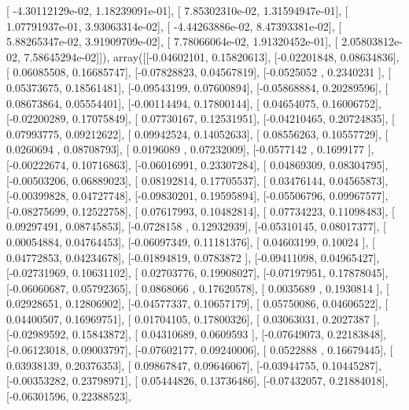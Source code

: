 \documentclass{article}
\begin{document}
       [ -4.30112129e-02,   1.18239091e-01],
       [  7.85302310e-02,   1.31594947e-01],
       [  1.07791937e-01,   3.93063314e-02],
       [ -4.44263886e-02,   8.47393381e-02],
       [  5.88265347e-02,   3.91909709e-02],
       [  7.78066064e-02,   1.91320452e-01],
       [  2.05803812e-02,   7.58645294e-02]]), array([[-0.04602101,  0.15820613],
       [-0.02201848,  0.08634836],
       [ 0.06085508,  0.16685747],
       [-0.07828823,  0.04567819],
       [-0.0525052 ,  0.2340231 ],
       [ 0.05373675,  0.18561481],
       [-0.09543199,  0.07600894],
       [-0.05868884,  0.20289596],
       [ 0.08673864,  0.05554401],
       [-0.00114494,  0.17800144],
       [ 0.04654075,  0.16006752],
       [-0.02200289,  0.17075849],
       [ 0.07730167,  0.12531951],
       [-0.04210465,  0.20724835],
       [ 0.07993775,  0.09212622],
       [ 0.09942524,  0.14052633],
       [ 0.08556263,  0.10557729],
       [ 0.0260694 ,  0.08708793],
       [ 0.0196089 ,  0.07232009],
       [-0.0577142 ,  0.1699177 ],
       [-0.00222674,  0.10716863],
       [-0.06016991,  0.23307284],
       [ 0.04869309,  0.08304795],
       [-0.00503206,  0.06889023],
       [ 0.08192814,  0.17705537],
       [ 0.03476144,  0.04565873],
       [-0.00399828,  0.04727748],
       [-0.09830201,  0.19595894],
       [-0.05506796,  0.09967577],
       [-0.08275699,  0.12522758],
       [ 0.07617993,  0.10482814],
       [ 0.07734223,  0.11098483],
       [ 0.09297491,  0.08745853],
       [-0.0728158 ,  0.12932939],
       [-0.05310145,  0.08017377],
       [ 0.00054884,  0.04764453],
       [-0.06097349,  0.11181376],
       [ 0.04603199,  0.10024   ],
       [ 0.04772853,  0.04234678],
       [-0.01894819,  0.0783872 ],
       [-0.09411098,  0.04965427],
       [-0.02731969,  0.10631102],
       [ 0.02703776,  0.19908027],
       [-0.07197951,  0.17878045],
       [-0.06060687,  0.05792365],
       [ 0.0868066 ,  0.17620578],
       [ 0.0035689 ,  0.1930814 ],
       [ 0.02928651,  0.12806902],
       [-0.04577337,  0.10657179],
       [ 0.05750086,  0.04606522],
       [ 0.04400507,  0.16969751],
       [ 0.01704105,  0.17800326],
       [ 0.03063031,  0.2027387 ],
       [-0.02989592,  0.15843872],
       [ 0.04310689,  0.0609593 ],
       [-0.07649073,  0.22183848],
       [-0.06123018,  0.09003797],
       [-0.07602177,  0.09240006],
       [ 0.0522888 ,  0.16679445],
       [ 0.03938139,  0.20376353],
       [ 0.09867847,  0.09646067],
       [-0.03944755,  0.10445287],
       [-0.00353282,  0.23798971],
       [ 0.05444826,  0.13736486],
       [-0.07432057,  0.21884018],
       [-0.06301596,  0.22388523],
\end{document}
